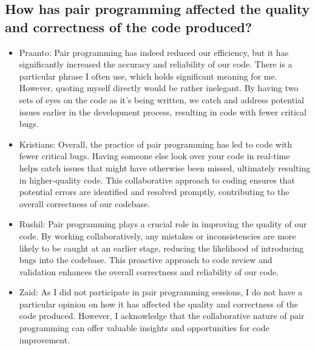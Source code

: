 \subsection{How has pair programming affected the quality and correctness of the code produced?}
\begin{itemize}
    \item Praanto:  Pair programming has indeed reduced our efficiency, but it has significantly increased the accuracy and reliability of our code. There is a particular phrase I often use, which holds significant meaning for me. However, quoting myself directly would be rather inelegant. By having two sets of eyes on the code as it's being written, we catch and address potential issues earlier in the development process, resulting in code with fewer critical bugs.
    \item Kristians: Overall, the practice of pair programming has led to code with fewer critical bugs. Having someone else look over your code in real-time helps catch issues that might have otherwise been missed, ultimately resulting in higher-quality code. This collaborative approach to coding ensures that potential errors are identified and resolved promptly, contributing to the overall correctness of our codebase.
    \item Rushil: Pair programming plays a crucial role in improving the quality of our code. By working collaboratively, any mistakes or inconsistencies are more likely to be caught at an earlier stage, reducing the likelihood of introducing bugs into the codebase. This proactive approach to code review and validation enhances the overall correctness and reliability of our code.
    \item Zaid: As I did not participate in pair programming sessions, I do not have a particular opinion on how it has affected the quality and correctness of the code produced. However, I acknowledge that the collaborative nature of pair programming can offer valuable insights and opportunities for code improvement.
\end{itemize}
